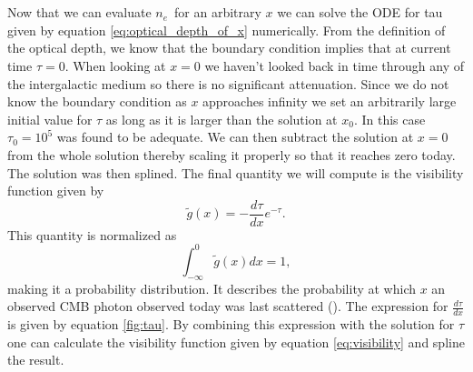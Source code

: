 \documentclass[onecolumn]{aastex62}
\begin{document}
\\\\\indent
Now that we can evaluate $n_e$ for an arbitrary $x$ we can solve the ODE for tau given by equation \ref{eq:optical_depth_of_x} numerically. From the definition of the optical depth, we know that the boundary condition implies that at current time $\tau=0$. When looking at $x=0$ we haven't looked back in time through any of the intergalactic medium so there is no significant attenuation. Since we do not know the boundary condition as $x$ approaches infinity we set an arbitrarily large initial value for $\tau$ as long as it is larger than the solution at $x_0$. In this case $\tau_0=10^5$ was found to be adequate. We can then subtract the solution at $x=0$ from the whole solution thereby scaling it properly so that it reaches zero today. The solution was then splined. The final quantity we will compute is the visibility function given by
\begin{equation}\label{eq:visibility}
    \widetilde{g}(x)=-\frac{d\tau}{dx}e^{-\tau}.
\end{equation}
This quantity is normalized as
\begin{equation}
    \int_{-\infty}^{0} \tilde{g}(x)dx = 1,
\end{equation}
making it a probability distribution. It describes the probability at which $x$ an observed CMB photon observed today was last scattered (\cite{callin2006calculate}). The expression for $\frac{d\tau}{dx}$ is given by equation \ref{fig:tau}. By combining this expression with the solution for $\tau$ one can calculate the visibility function given by equation \ref{eq:visibility} and spline the result.
\end{document}
